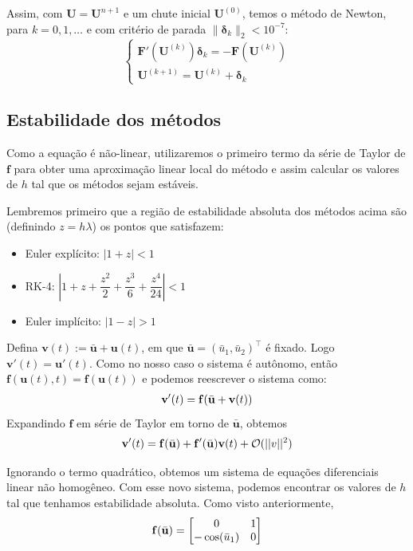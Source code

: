 \documentclass{article}
\newcommand{\bd}[1]{\mathbf{#1}} %
\newcommand{\bb}[1]{\bar{\mathbf{#1}}} %
\begin{document}
    Assim, com $\bd{U} = \bd{U}^{n+1}$ e um chute inicial $\bd{U}^{(0)}$, temos o método de Newton, para $k=0,1,\ldots$ e com critério de parada $\|\boldsymbol{\delta}_k\|_2 < 10^{-7}$:
    \[\begin{cases}
        \bd{F}'(\bd{U}^{(k)})\boldsymbol{\delta}_k = - \bd{F}(\bd{U}^{(k)})\\
        \bd{U}^{(k+1)} = \bd{U}^{(k)} + \boldsymbol{\delta}_k
    \end{cases}\]

    \subsection{Estabilidade dos métodos}
    Como a equação é não-linear, utilizaremos o primeiro termo da série de Taylor de $\bd{f}$ para obter uma aproximação linear local do método e assim calcular os valores de $h$ tal que os métodos sejam estáveis.
    
    Lembremos primeiro que a região de estabilidade absoluta dos métodos acima são (definindo $z = h\lambda$) os pontos que satisfazem:
    \begin{itemize}
        \item Euler explícito: $|1+z| < 1$
        \item RK-4: $\left|1 + z + \dfrac{z^2}{2} + \dfrac{z^3}{6} + \dfrac{z^4}{24}\right| < 1$
        \item Euler implícito: $|1-z| > 1$
    \end{itemize}
    
    Defina $\bd{v}(t) := \bb{u} + \bd{u}(t)$, em que $\bb{u} = (\bar{u}_1, \bar{u}_2)^\top$ é fixado. Logo $\bd{v}'(t) = \bd{u}'(t)$. Como no nosso caso o sistema é autônomo, então $\bd{f}(\bd{u}(t), t) = \bd{f}(\bd{u}(t))$ e podemos reescrever o sistema como:
    \begin{align}
        \bd{v}'(t) = \bd{f}(\bb{u} + \bd{v}(t)) \notag
    \end{align}
    Expandindo $\bd{f}$ em série de Taylor em torno de $\bb{u}$, obtemos
    \begin{align}
        \bd{v}'(t) = \bd{f}(\bb{u}) + \bd{f}'(\bb{u})\bd{v}(t) + \mathcal{O}(||v||^2) \notag
    \end{align}

    Ignorando o termo quadrático, obtemos um sistema de equações diferenciais linear não homogêneo. Com esse novo sistema, podemos encontrar os valores de $h$ tal que tenhamos estabilidade absoluta. Como visto anteriormente,
    \begin{align}
        \bd{f}(\bb{u}) = \begin{bmatrix}
            0 & 1 \\
            -\cos(\bar{u}_1) & 0
        \end{bmatrix} \notag
    \end{align}
\end{document}

